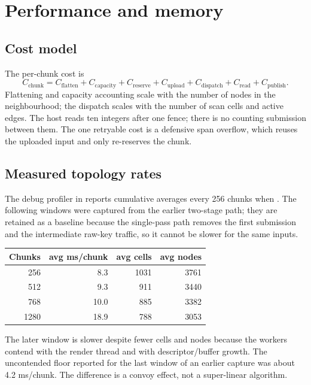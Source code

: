\section{Performance and memory}
\label{sec:perf}

\subsection{Cost model}

The per-chunk cost is
\begin{equation}
  C_{\text{chunk}} =
  C_{\text{flatten}} + C_{\text{capacity}} + C_{\text{reserve}} +
  C_{\text{upload}} + C_{\text{dispatch}} + C_{\text{read}} +
  C_{\text{publish}}.
\end{equation}
Flattening and capacity accounting scale with the number of nodes in the
neighbourhood; the dispatch scales with the number of scan cells and active
edges.  The host reads ten integers after one fence; there is no counting
submission between them.  The one retryable cost is a defensive span
overflow, which reuses the uploaded input and only re-reserves the chunk.

\subsection{Measured topology rates}

The debug profiler in  reports cumulative
averages every 256 chunks when .  The following
windows were captured from the earlier two-stage path; they are retained as
a baseline because the single-pass path removes the first submission and
the intermediate raw-key traffic, so it cannot be slower for the same
inputs.

\begin{center}
\begin{tabular}{@{}rrrr@{}}
\toprule
Chunks & avg ms/chunk & avg cells & avg nodes\\
\midrule
256  & 8.3  & 1031 & 3761\\
512  & 9.3  & 911  & 3440\\
768  & 10.0 & 885  & 3382\\
1280 & 18.9 & 788  & 3053\\
\bottomrule
\end{tabular}
\end{center}

The later window is slower despite fewer cells and nodes because the
workers contend with the render thread and with descriptor/buffer growth.
The uncontended floor reported for the last window of an earlier capture
was about 4.2 ms/chunk.  The difference is a convoy effect, not a
super-linear algorithm.

